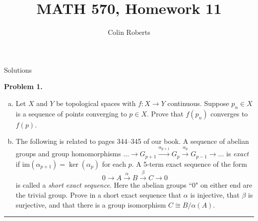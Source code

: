 \documentclass[leqno]{article}
\author{Colin Roberts}
\title{MATH 570, Homework 11}
\theoremstyle{nonumberplain}
\newcommand{\im}{\ensuremath{\mathrm{im}}}
\begin{document}
\maketitle
\begin{large}
\begin{center}
Solutions
\end{center}
\end{large}
\pagebreak


\noindent\textbf{Problem 1.} ~
\begin{enumerate}[(a)]
\item Let $X$ and $Y$ be topological spaces with $f\colon X\to Y$ continuous. Suppose $p_n\in X$ is a sequence of points converging to $p\in X$. Prove that $f(p_n)$ converges to $f(p)$.
\item The following is related to pages 344--345 of our book. A sequence of abelian groups and group homomorphisms $\ldots \to G_{p+1} \xrightarrow{\alpha_{p+1}}G_p \xrightarrow{\alpha_p} G_{p-1} \to \ldots$ is \emph{exact} if $\im(\alpha_{p+1}) = \ker(\alpha_p)$ for each $p$. A 5-term exact sequence of the form
\[0\to A\xrightarrow{\alpha} B\xrightarrow{\beta} C\to 0\]
is called a \emph{short exact sequence}. Here the abelian groups ``$0$" on either end are the trivial group. Prove in a short exact sequence that $\alpha$ is injective, that $\beta$ is surjective, and that there is a group isomorphism $C\cong B/\alpha(A)$.
\end{enumerate}

\noindent\rule[0.5ex]{\linewidth}{1pt}
\end{document}

